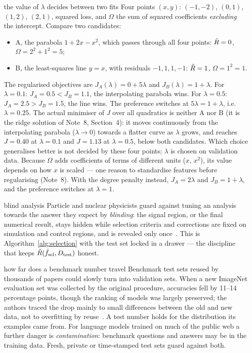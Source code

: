 \documentclass[11pt]{article}
\begin{document}
\begin{worked}{the value of $\lambda$ decides between two fits}
Four points $(x, y)$: $(-1, -2)$, $(0, 1)$, $(1, 2)$, $(2, 1)$, squared loss, and $\Omega$ the sum of squared
coefficients \emph{excluding} the intercept. Compare two candidates:
\begin{itemize}
\item A, the parabola $1 + 2x - x^2$, which passes through all four points: $\hat R = 0$, $\Omega = 2^2 + 1^2 = 5$;
\item B, the least-squares line $y = x$, with residuals $-1, 1, 1, -1$: $\hat R = 1$, $\Omega = 1^2 = 1$.
\end{itemize}
The regularised objectives are $J_A(\lambda) = 0 + 5\lambda$ and $J_B(\lambda) = 1 + \lambda$. For $\lambda = 0.1$:
$J_A = 0.5 < J_B = 1.1$, the interpolating parabola wins. For $\lambda = 0.5$: $J_A = 2.5 > J_B = 1.5$, the line wins.
The preference switches at $5\lambda = 1 + \lambda$, i.e.\ $\lambda = 0.25$. The actual minimiser of $J$ over all
quadratics is neither A nor B (it is the ridge solution of Note~8, Section~4): it moves continuously from the interpolating parabola ($\lambda \to 0$) towards a flatter
curve as $\lambda$ grows, and reaches $J = 0.40$ at $\lambda = 0.1$ and $J = 1.13$ at $\lambda = 0.5$, below both
candidates. Which choice generalises better is not
decided by these four points; $\lambda$ is chosen on validation data. Because $\Omega$ adds coefficients of terms of
different units ($x$, $x^2$), its value depends on how $x$ is scaled --- one reason to standardise features before
regularising (Note~8). With the degree penalty instead, $J_A = 2\lambda$ and $J_B = 1 + \lambda$, and the preference
switches at $\lambda = 1$.
\end{worked}

\begin{physics}{blind analysis}
Particle and nuclear physicists guard against tuning an analysis towards the answer they expect by \emph{blinding}:
the signal region, or the final numerical result, stays hidden while selection criteria and corrections are fixed
on simulation and control regions, and is revealed only once~\cite{klein2005}. This is Algorithm~\ref{alg:selection}
with the test set locked in a drawer --- the discipline that keeps $\hat R(\hat f_{\mathrm{sel}}, D_{\mathrm{test}})$ honest.
\end{physics}

\begin{modern}{how far does a benchmark number travel}
Benchmark test sets reused by thousands of papers could slowly turn into validation sets.
When a new ImageNet evaluation set was collected by the original procedure, accuracies fell by 11--14 percentage
points, though the ranking of models was largely preserved; the authors traced the drop mainly to small differences
between the old and new data, not to overfitting by reuse~\cite{recht2019}. A test number holds for the distribution
its examples came from. For language models trained on much of the public web a further danger is
\emph{contamination}: benchmark questions and answers may be in the training data. Fresh, private or time-stamped test
sets guard against both.
\end{modern}
\end{document}
